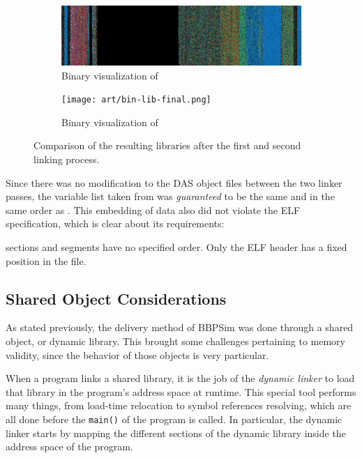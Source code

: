 {\begin{figure}[htbp]
	\centering
	\begin{subfigure}{\linewidth}
		\centering
		\includegraphics[width=\linewidth, keepaspectratio]{art/bin-lib-intermediate.png}
		\caption{Binary visualization of }
		\label{fig:bin-lib-intermediate}
	\end{subfigure}
	\vspace{12pt}
	\begin{subfigure}{\linewidth}
		\centering
		\texttt{[image: art/bin-lib-final.png]}
		\caption{Binary visualization of }
		\label{fig:bin-lib-final}
	\end{subfigure}
	\caption{Comparison of the resulting libraries after the first and second linking process.}
	\label{fig:bin-lib-comp}
\end{figure}

Since there was no modification to the DAS object files between the two linker passes, the variable list taken from  was \textit{guaranteed} to be the same and in the same order as . This embedding of data also did not violate the ELF specification, which is clear about its requirements:

\begin{shadedquotation}
[...] sections and segments have no specified order. Only the ELF header has a fixed position in the file.\cite{online:elf-spec}
\end{shadedquotation}

\subsection*{Shared Object Considerations}
As stated previously, the delivery method of BBPSim was done through a shared object, or dynamic library. This brought some challenges pertaining to memory validity, since the behavior of those objects is very particular.

When a program links a shared library, it is the job of the \textit{dynamic linker} to load that library in the program's address space at runtime. This special tool performs many things, from load-time relocation to symbol references resolving\cite{online:elf-reloc}, which are all done before the \texttt{main()} of the program is called. In particular, the dynamic linker starts by mapping the different sections of the dynamic library inside the address space of the program. 

}
